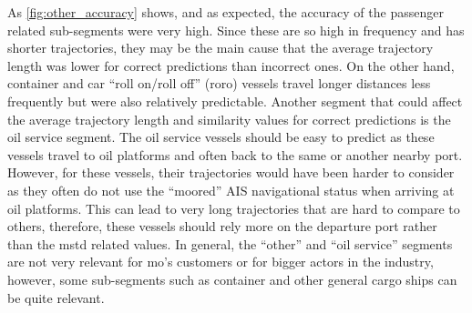 As \cref{fig:other_accuracy} shows, and as expected, the accuracy of the passenger related sub-segments were very high. Since these are so high in frequency and has shorter trajectories, they may be the main cause that the average trajectory length was lower for correct predictions than incorrect ones. On the other hand, container and car ``roll on/roll off'' (roro) vessels travel longer distances less frequently but were also relatively predictable. Another segment that could affect the average trajectory length and similarity values for correct predictions is the oil service segment. The oil service vessels should be easy to predict as these vessels travel to oil platforms and often back to the same or another nearby port. However, for these vessels, their trajectories would have been harder to consider as they often do not use the ``moored'' AIS navigational status when arriving at oil platforms. This can lead to very long trajectories that are hard to compare to others, therefore, these vessels should rely more on the departure port rather than the \acrshort{mstd} related values. In general, the ``other'' and ``oil service'' segments are not very relevant for \acrfull{mo}'s customers or for bigger actors in the industry, however, some sub-segments such as container and other general cargo ships can be quite relevant.

